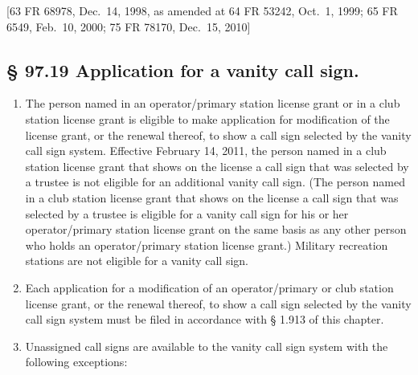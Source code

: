 \documentclass[
  letterpaper,
  DIV=11,
  numbers=noendperiod]{scrreport}
\begin{document}
{[}63 FR 68978, Dec.~14, 1998, as amended at 64 FR 53242, Oct.~1, 1999;
65 FR 6549, Feb.~10, 2000; 75 FR 78170, Dec.~15, 2010{]}

\hypertarget{application-for-a-vanity-call-sign.}{%
\subsection*{§ 97.19 Application for a vanity call
sign.}\label{application-for-a-vanity-call-sign.}}

\begin{enumerate}
\def\labelenumi{(\alph{enumi})}
\item
  The person named in an operator/primary station license grant or in a
  club station license grant is eligible to make application for
  modification of the license grant, or the renewal thereof, to show a
  call sign selected by the vanity call sign system. Effective February
  14, 2011, the person named in a club station license grant that shows
  on the license a call sign that was selected by a trustee is not
  eligible for an additional vanity call sign. (The person named in a
  club station license grant that shows on the license a call sign that
  was selected by a trustee is eligible for a vanity call sign for his
  or her operator/primary station license grant on the same basis as any
  other person who holds an operator/primary station license grant.)
  Military recreation stations are not eligible for a vanity call sign.
\item
  Each application for a modification of an operator/primary or club
  station license grant, or the renewal thereof, to show a call sign
  selected by the vanity call sign system must be filed in accordance
  with § 1.913 of this chapter.
\item
  Unassigned call signs are available to the vanity call sign system
  with the following exceptions:
\end{enumerate}
\end{document}
